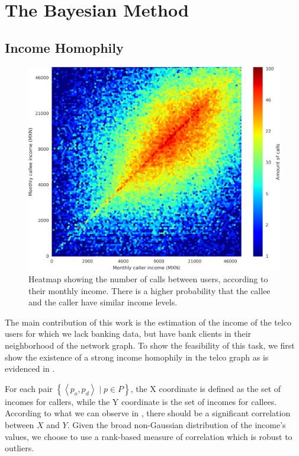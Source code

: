 \section{The Bayesian Method}
\label{sec:inference_methodology}

\subsection{Income Homophily}
\label{subsec:income_homophily}

\begin{figure}
\centering
\includegraphics[width=\columnwidth]{figures/Homophily_income_origin_target_1/Homophily_income_origin_target_1.png}
\caption{Heatmap showing the number of calls between users, according to their monthly income. There is a higher probability that the callee and the caller have similar income levels.}
\label{fig:homophily_heatmap}
\end{figure}

The main contribution of this work is the estimation of the income of the telco users for which we lack banking data, but have bank clients in their neighborhood of the network graph. To show the feasibility of this task, we first show the existence of a strong income homophily in the telco graph as is evidenced in .

For each pair $\left\{ \left< p_o, p_d \right> \mid p \in P \right\}$, the X coordinate is defined as the set of incomes for callers, while the Y coordinate is the set of incomes for callees. According to what we can observe in , there should be a significant correlation between $X$ and $Y$. Given the broad non-Gaussian distribution of the income's values, we choose to use a rank-based measure of correlation which is robust to outliers.

